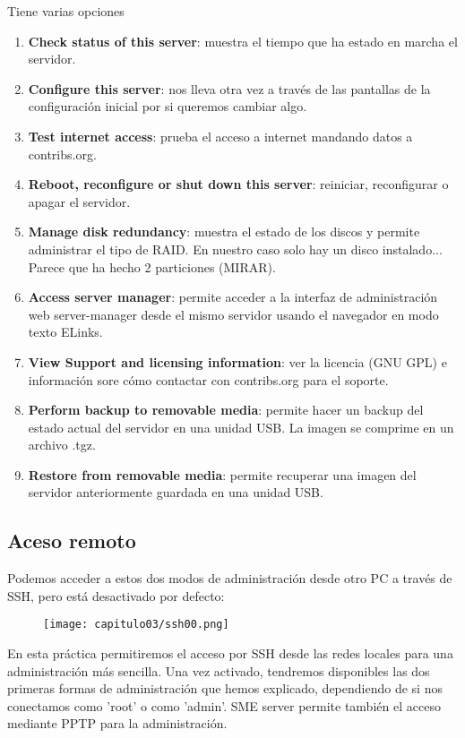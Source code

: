 Tiene varias opciones
\begin{enumerate}
 \item \textbf{Check status of this server}: muestra el tiempo que ha estado en marcha el servidor.
\item \textbf{Configure this server}: nos lleva otra vez a través de las pantallas de la configuración inicial por si queremos cambiar algo.
\item \textbf{Test internet access}: prueba el acceso a internet mandando datos a contribs.org.
\item \textbf{Reboot, reconfigure or shut down this server}: reiniciar, reconfigurar o apagar el servidor.
\item \textbf{Manage disk redundancy}: muestra el estado de los discos y permite administrar el tipo de RAID. En nuestro caso solo hay un disco instalado... Parece que ha hecho 2 particiones (MIRAR).
\item \textbf{Access server manager}: permite acceder a la interfaz de administración web server-manager desde el mismo servidor usando el navegador en modo texto ELinks.
\item \textbf{View Support and licensing information}: ver la licencia (GNU GPL) e información sore cómo contactar con contribs.org para el soporte.
\item \textbf{Perform backup to removable media}: permite hacer un backup del estado actual del servidor en una unidad USB. La imagen se comprime en un archivo .tgz.
\item \textbf{Restore from removable media}: permite recuperar una imagen del servidor anteriormente guardada en una unidad USB.
\end{enumerate}

\subsection{Aceso remoto}
Podemos acceder a estos dos modos de administración desde otro PC a través de SSH, pero está desactivado por defecto:

\begin{figure}[H]
    \centering
    \texttt{[image: capitulo03/ssh00.png]}
\end{figure}

En esta práctica permitiremos el acceso por SSH desde las redes locales para una administración más sencilla. Una vez activado, tendremos disponibles las dos primeras formas de administración que hemos explicado, dependiendo de si nos conectamos como 'root' o como 'admin'. SME server permite también el acceso mediante PPTP para la administración.

